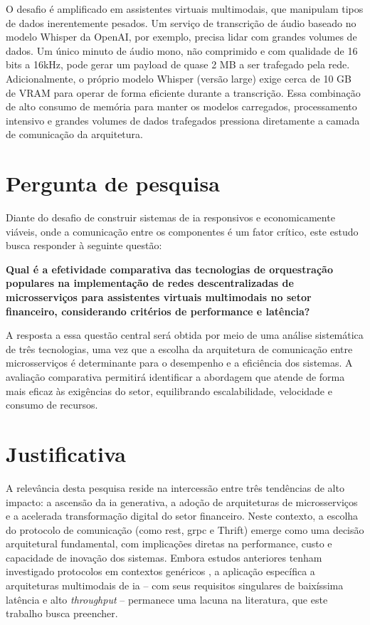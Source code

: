O desafio é amplificado em assistentes virtuais multimodais, que manipulam tipos de dados inerentemente pesados. Um serviço de transcrição de áudio baseado no modelo Whisper da OpenAI, por exemplo, precisa lidar com grandes volumes de dados. Um único minuto de áudio mono, não comprimido e com qualidade de 16 bits a 16kHz, pode gerar um payload de quase 2 MB a ser trafegado pela rede. Adicionalmente, o próprio modelo Whisper (versão large) exige cerca de 10 GB de VRAM para operar de forma eficiente durante a transcrição. Essa combinação de alto consumo de memória para manter os modelos carregados, processamento intensivo e grandes volumes de dados trafegados pressiona diretamente a camada de comunicação da arquitetura.

\section{Pergunta de pesquisa}

Diante do desafio de construir sistemas de \gls{ia} responsivos e economicamente viáveis, onde a comunicação entre os componentes é um fator crítico, este estudo busca responder à seguinte questão:

\textbf{Qual é a efetividade comparativa das tecnologias de orquestração populares na implementação de redes descentralizadas de microsserviços para assistentes virtuais multimodais no setor financeiro, considerando critérios de performance e latência?}

A resposta a essa questão central será obtida por meio de uma análise sistemática de três tecnologias, uma vez que a escolha da arquitetura de comunicação entre microsserviços é determinante para o desempenho e a eficiência dos sistemas. A avaliação comparativa permitirá identificar a abordagem que atende de forma mais eficaz às exigências do setor, equilibrando escalabilidade, velocidade e consumo de recursos.


\section{Justificativa}

A relevância desta pesquisa reside na intercessão entre três tendências de alto impacto: a ascensão da \gls{ia} generativa, a adoção de arquiteturas de microsserviços e a acelerada transformação digital do setor financeiro. Neste contexto, a escolha do protocolo de comunicação (como \gls{rest}, \gls{grpc} e Thrift) emerge como uma decisão arquitetural fundamental, com implicações diretas na performance, custo e capacidade de inovação dos sistemas. Embora estudos anteriores tenham investigado protocolos em contextos genéricos \cite{niswar_performance_2024}, a aplicação específica a arquiteturas multimodais de \gls{ia} -- com seus requisitos singulares de baixíssima latência e alto \textit{throughput} -- permanece uma lacuna na literatura, que este trabalho busca preencher.

